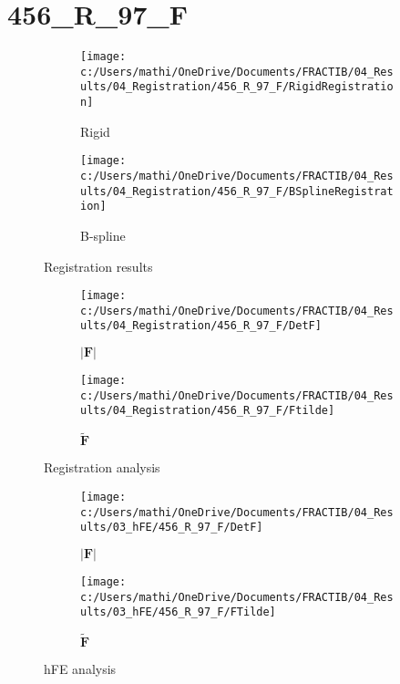 \documentclass{article}%
\begin{document}
%
\newpage%
\section*{456\_R\_97\_F}%
\label{sec:456R97F}%


\begin{figure}[h!]%
\begin{subfigure}[b]{0.5\linewidth}%
\texttt{[image: c:/Users/mathi/OneDrive/Documents/FRACTIB/04\_Results/04\_Registration/456\_R\_97\_F/RigidRegistration]}%
\caption{Rigid}%
\end{subfigure}%
\begin{subfigure}[b]{0.5\linewidth}%
\texttt{[image: c:/Users/mathi/OneDrive/Documents/FRACTIB/04\_Results/04\_Registration/456\_R\_97\_F/BSplineRegistration]}%
\caption{B{-}spline}%
\end{subfigure}%
\caption{Registration results}%
\end{figure}

%


\begin{figure}[h!]%
\begin{subfigure}[b]{0.5\linewidth}%
\texttt{[image: c:/Users/mathi/OneDrive/Documents/FRACTIB/04\_Results/04\_Registration/456\_R\_97\_F/DetF]}%
\caption{$|\mathbf{F}|$}%
\end{subfigure}%
\begin{subfigure}[b]{0.5\linewidth}%
\texttt{[image: c:/Users/mathi/OneDrive/Documents/FRACTIB/04\_Results/04\_Registration/456\_R\_97\_F/Ftilde]}%
\caption{$\tilde{\mathbf{F}}$}%
\end{subfigure}%
\caption{Registration analysis}%
\end{figure}

%


\begin{figure}[h!]%
\begin{subfigure}[b]{0.5\linewidth}%
\texttt{[image: c:/Users/mathi/OneDrive/Documents/FRACTIB/04\_Results/03\_hFE/456\_R\_97\_F/DetF]}%
\caption{$|\mathbf{F}|$}%
\end{subfigure}%
\begin{subfigure}[b]{0.5\linewidth}%
\texttt{[image: c:/Users/mathi/OneDrive/Documents/FRACTIB/04\_Results/03\_hFE/456\_R\_97\_F/FTilde]}%
\caption{$\tilde{\mathbf{F}}$}%
\end{subfigure}%
\caption{hFE analysis}%
\end{figure}

%
\newpage%
\end{document}
